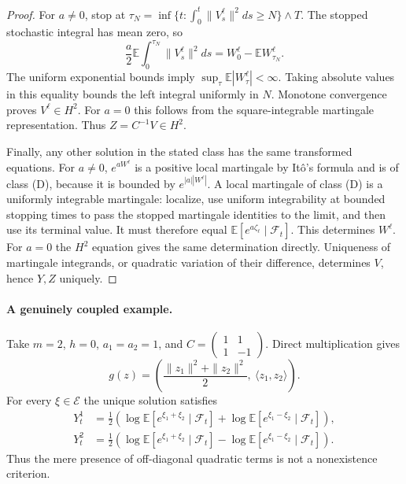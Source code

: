 \documentclass[11pt,a4paper]{article}
\newcommand{\E}{\mathbb E}
\theoremstyle{definition}
\theoremstyle{remark}
\begin{document}
\begin{proof}
For $a\ne0$, stop at $\tau_N=\inf\{t:\int_0^t\|V_s^\ell\|^2ds\geq N\}\wedge T$. The stopped stochastic integral has mean zero, so
\[
 \frac a2\E\int_0^{\tau_N}\|V_s^\ell\|^2ds
 =W_0^\ell-\E W_{\tau_N}^\ell.
\]
The uniform exponential bounds imply $\sup_\tau\E|W_\tau^\ell|<\infty$. Taking absolute values in this equality bounds the left integral uniformly in $N$. Monotone convergence proves $V^\ell\in H^2$. For $a=0$ this follows from the square-integrable martingale representation. Thus $Z=C^{-1}V\in H^2$.

Finally, any other solution in the stated class has the same transformed equations. For $a\ne0$, $e^{aW^\ell}$ is a positive local martingale by It\^o's formula and is of class (D), because it is bounded by $e^{|a||W^\ell|}$. A local martingale of class (D) is a uniformly integrable martingale: localize, use uniform integrability at bounded stopping times to pass the stopped martingale identities to the limit, and then use its terminal value. It must therefore equal $\E[e^{a\zeta_\ell}\mid\mathcal F_t]$. This determines $W^\ell$. For $a=0$ the $H^2$ equation gives the same determination directly. Uniqueness of martingale integrands, or quadratic variation of their difference, determines $V$, hence $Y,Z$ uniquely.
\end{proof}

\paragraph{A genuinely coupled example.}
Take $m=2$, $h=0$, $a_1=a_2=1$, and
$C=\left(\begin{smallmatrix}1&1\\1&-1\end{smallmatrix}\right)$. Direct multiplication gives
\[
 g(z)=\left(\frac{\|z_1\|^2+\|z_2\|^2}{2},\ \langle z_1,z_2\rangle\right).
\]
For every $\xi\in\mathcal E$ the unique solution satisfies
\begin{align*}
 Y_t^1&=\tfrac12\left(\log\E[e^{\xi_1+\xi_2}\mid\mathcal F_t]
                    +\log\E[e^{\xi_1-\xi_2}\mid\mathcal F_t]\right),\\
 Y_t^2&=\tfrac12\left(\log\E[e^{\xi_1+\xi_2}\mid\mathcal F_t]
                    -\log\E[e^{\xi_1-\xi_2}\mid\mathcal F_t]\right).
\end{align*}
Thus the mere presence of off-diagonal quadratic terms is not a nonexistence criterion.
\end{document}
